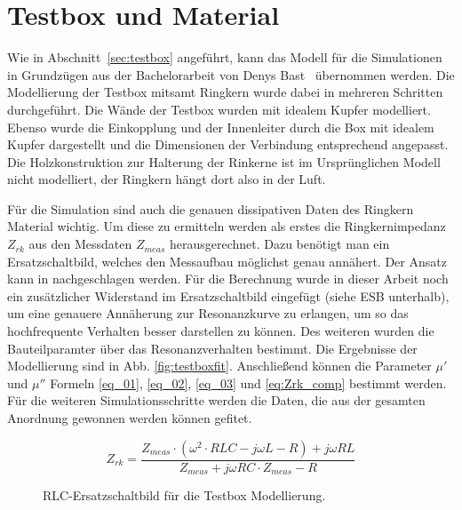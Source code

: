 \section{Testbox und Material}
Wie in Abschnitt~\ref{sec:testbox} angef\"uhrt, kann das Modell f\"ur die Simulationen in Grundz\"ugen aus der Bachelorarbeit von Denys Bast~\citep{bast2017ba} \"ubernommen werden. Die Modellierung der Testbox mitsamt Ringkern wurde dabei in mehreren Schritten durchgef\"uhrt. Die W\"ande der Testbox wurden mit idealem Kupfer modelliert. Ebenso wurde die Einkopplung und der Innenleiter durch die Box mit idealem Kupfer dargestellt und die Dimensionen der Verbindung entsprechend angepasst. Die Holzkonstruktion zur Halterung der Rinkerne ist im Urspr\"unglichen Modell nicht modelliert, der Ringkern h\"angt dort also in der Luft.
\par

F\"ur die Simulation sind auch die genauen dissipativen Daten des Ringkern Material wichtig. Um diese zu ermitteln werden als erstes die Ringkernimpedanz $Z_{rk}$ aus den Messdaten $Z_{meas}$ herausgerechnet. Dazu benötigt man ein Ersatzschaltbild, welches den Messaufbau möglichst genau annähert. Der Ansatz kann in \citep{bast2017ba} nachgeschlagen werden. F\"ur die Berechnung wurde in dieser Arbeit noch ein zus\"atzlicher Widerstand im Ersatzschaltbild eingef\"ugt (siehe ESB unterhalb), um eine genauere Ann\"aherung zur Resonanzkurve zu erlangen, um so das hochfrequente Verhalten besser darstellen zu k\"onnen. Des weiteren wurden die Bauteilparamter \"uber das Resonanzverhalten bestimmt. Die Ergebnisse der Modellierung sind in Abb. \ref{fig:testboxfit}.
Anschlie\ss{}end k\"onnen die Parameter $\mu'$ und $\mu''$ Formeln \ref{eq_01}, \ref{eq_02}, \ref{eq_03} und \ref{eq:Zrk_comp} bestimmt werden. F\"ur die weiteren Simulationsschritte werden die Daten, die aus der gesamten Anordnung gewonnen werden k\"onnen gefitet.        


\begin{equation}\label{eq:Zrk_comp}
Z_{rk} = \frac{Z_{meas}\cdot(\omega^2\cdot RLC - j\omega L - R) + j\omega RL}{Z_{meas} + j\omega RC\cdot Z_{meas} -R}
\end{equation}

\par
\begin{figure}[htb]
\centering
{}
\caption{RLC-Ersatzschaltbild f\"ur die Testbox Modellierung.}
\end{figure}

